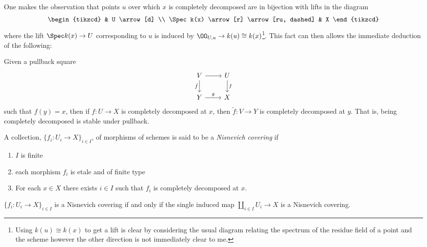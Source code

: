\documentclass[12pt]{article}
\numberwithin{equation}{section}
\numberwithin{lemma}{section}
\numberwithin{theorem}{section}
\numberwithin{proposition}{section}
\numberwithin{corollary}{section}
\numberwithin{definition}{section}
\numberwithin{example}{section}
\numberwithin{remark}{section}
\begin{document}
One makes the observation that points $u$ over which $x$ is completely
decomposed are in bijection with lifts in the diagram
\begin{equation*}\label{eq:lift-condition}
  \begin{tikzcd}
    & U \arrow[d] \\
    \Spec k(x) \arrow[r] \arrow[ru, dashed] & X
  \end{tikzcd}
\end{equation*}
where the lift $\Spec k(x) \to U$ corresponding to $u$ is induced by
$\OO_{U, u} \to k(u) \cong k(x)$\footnote{Using $k(u) \cong k(x)$ to
  get a lift is clear by considering the usual diagram relating the
  spectrum of the residue field of a point and the scheme however the
  other direction is not immediately clear to me.}.
This fact can then allows the immediate deduction of the following:
\begin{lemma}
  Given a pullback square
  \begin{equation*}
    \begin{tikzcd}
      V \arrow[d, "\tilde{f}"'] \arrow[r] & U \arrow[d, "f"] \\
      Y \arrow[r, "g"]      & X
    \end{tikzcd}
  \end{equation*}
  such that $f(y) = x$, then if $f : U \to X$ is completely decomposed
  at $x$, then $\tilde{f} : V \to Y$ is completely decomposed at
  $y$. That is, being completely decomposed is stable under pullback.
\end{lemma}

\begin{definition}
  A collection, $\{f_i : U_i \to X\}_{i \in I}$, of morphisms of
  schemes is said to be a \emph{Nisnevich covering} if
  \begin{enumerate}[label=(\arabic*)]
  \item $I$ is finite
  \item each morphism $f_i$ is etale and of finite type
  \item For each $x \in X$ there exists $i \in I$ such that $f_i$ is
    completely decomposed at $x$.
  \end{enumerate}
\end{definition}

\begin{proposition}
  $\{f_i : U_i \to X\}_{i \in I}$ is a Nisnevich covering if and only if
  the single induced map $\coprod_{i \in I} U_i \to X$ is a Nisnevich
  covering.
\end{proposition}
\end{document}
